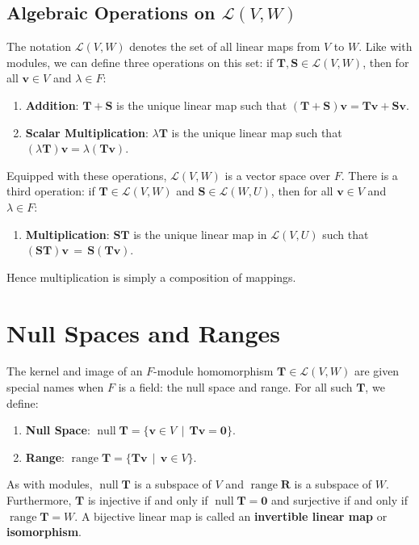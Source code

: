\documentclass[11pt]{article}
\renewcommand{\vec}[1]{\mathbf{#1}}
\newcommand{\mat}[1]{\mathbf{#1}}
\newcommand{\nll}{\operatorname{null}}
\newcommand{\range}{\operatorname{range}}
\begin{document}

\subsection{Algebraic Operations on \texorpdfstring{$\mathcal{L}(V, W)$}{L(V, W)}}

The notation $\mathcal{L}(V, W)$ denotes the set of all linear maps from $V$ to $W$. Like with modules, we can define three operations on this set: if $\mat{T}, \mat{S} \in \mathcal{L}(V, W)$, then for all $\vec{v} \in V$ and $\lambda \in F$:
\begin{enumerate}
  \item \textbf{Addition}: $\mat{T} + \mat{S}$ is the unique linear map such that $(\mat{T} + \mat{S}) \vec{v} = \mat{T} \vec{v} + \mat{S} \vec{v}$.
  \item \textbf{Scalar Multiplication}: $\lambda \mat{T}$ is the unique linear map such that $(\lambda \mat{T}) \vec{v} = \lambda (\mat{T} \vec{v})$.
\end{enumerate}
Equipped with these operations, $\mathcal{L}(V, W)$ is a vector space over $F$. There is a third operation: if $\mat{T} \in \mathcal{L}(V, W)$ and $\mat{S} \in \mathcal{L}(W, U)$, then for all $\vec{v} \in V$ and $\lambda \in F$:
\begin{enumerate}
  \item \textbf{Multiplication}: $\mat{ST}$ is the unique linear map in $\mathcal{L}(V, U)$ such that $(\mat{ST}) \vec{v} \, = \, \mat{S} (\mat{T} \vec{v})$.
\end{enumerate}
Hence multiplication is simply a composition of mappings.


\section{Null Spaces and Ranges}

The kernel and image of an $F$-module homomorphism $\mat{T} \in \mathcal{L}(V, W)$ are given special names when $F$ is a field: the null space and range. For all such $\mat{T}$, we define:
\begin{enumerate}
  \item \textbf{Null Space}: $\nll \mat{T} = \{ \vec{v} \in V \, \mid \, \mat{T} \vec{v} = \vec{0} \}$.
  \item \textbf{Range}: $\range \mat{T} = \{ \mat{T} \vec{v} \, \mid \, \vec{v} \in V \}$.
\end{enumerate}
As with modules, $\nll \mat{T}$ is a subspace of $V$ and $\range \mat{R}$ is a subspace of $W$. Furthermore, $\mat{T}$ is injective if and only if $\nll \mat{T} = \vec{0}$ and surjective if and only if $\range \mat{T} = W$. A bijective linear map is called an \textbf{invertible linear map} or \textbf{isomorphism}.
\end{document}
